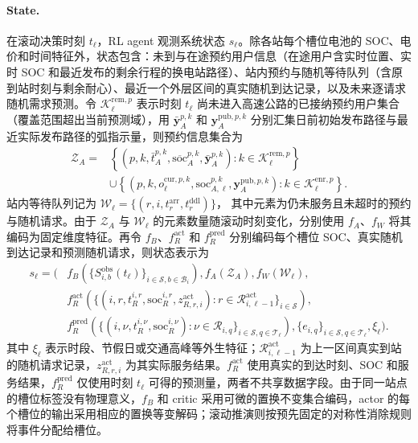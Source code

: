\documentclass[12pt,a4paper,UTF8]{ctexart}
\begin{document}
\paragraph{State.}
在滚动决策时刻 $t_\ell$，RL agent 观测系统状态 $s_\ell$。除各站每个槽位电池的 SOC、电价和时间特征外，状态包含：未到与在途预约用户信息（在途用户含实时位置、实时 SOC 和最近发布的剩余行程的换电站路径）、站内预约与随机等待队列（含原到站时刻与剩余耐心）、最近一个外层区间的真实随机到达记录，以及未来逐请求随机需求预测。令
$\mathcal K_\ell^{\mathrm{rem},p}$ 表示时刻 $t_\ell$ 尚未进入高速公路的已接纳预约用户集合（覆盖范围超出当前预测域），用 $\bar{\mathbf y}_A^{p,k}$ 和 $\mathbf y_A^{\mathrm{pub},p,k}$ 分别汇集日前初始发布路径与最近实际发布路径的弧指示量，则预约信息集合为
\begin{equation}
\begin{aligned}
\mathcal Z_{A}
={}&
\left\{
\left(p,k,\bar t_A^{p,k},
\overline{\mathrm{soc}}_A^{p,k},
\bar{\mathbf y}_A^{p,k}\right):
k\in\mathcal K_\ell^{\mathrm{rem},p}
\right\}\\
&\cup
\left\{
\left(p,k,o_\ell^{\mathrm{cur},p,k},\mathrm{soc}_{A,\ell}^{p,k},
\mathbf y_A^{\mathrm{pub},p,k}\right):
k\in\mathcal K_\ell^{\mathrm{enr},p}
\right\}.
\end{aligned}
\label{eq:rl_reservation_information}
\end{equation}
站内等待队列记为
$\mathcal W_\ell=\{(r,i,t_r^{\mathrm{arr}},t_r^{\mathrm{ddl}})\}$，
其中元素为仍未服务且未超时的预约与随机请求。由于 $\mathcal Z_{A}$ 与 $\mathcal W_\ell$ 的元素数量随滚动时刻变化，分别使用 $f_A$、$f_W$ 将其编码为固定维度特征。再令 $f_B$、$f_R^{\mathrm{act}}$ 和 $f_R^{\mathrm{pred}}$ 分别编码每个槽位 SOC、真实随机到达记录和预测随机请求，则状态表示为
\begin{equation}
\begin{aligned}
s_\ell=\Big(&
f_B\!\left(\{S_{i,b}^{\mathrm{obs}}(t_\ell)\}_{i\in\mathcal S,b\in\mathcal B_i}\right),
f_A(\mathcal Z_{A}),
f_W(\mathcal W_\ell),\\
&
f_R^{\mathrm{act}}\!\left(
\{(i,r,t_R^{i,r},\mathrm{soc}_R^{i,r},z_{R,r,i}^{\mathrm{act}}):
r\in\mathcal R_{i,\ell-1}^{\mathrm{act}}\}_{i\in\mathcal S}
\right),\\
&
f_R^{\mathrm{pred}}\!\left(
\{(i,\nu,t_{R}^{i,\nu},\mathrm{soc}_{R}^{i,\nu}):
\nu\in\mathcal R_{i,q}\}_{i\in\mathcal S,q\in\mathcal T_\ell}
\right),
\{e_{i,q}\}_{i\in\mathcal S,q\in\mathcal T_\ell},
\xi_\ell
\Big).
\end{aligned}
\label{eq:rl_state}
\end{equation}
其中 $\xi_\ell$ 表示时段、节假日或交通高峰等外生特征；$\mathcal R_{i,\ell-1}^{\mathrm{act}}$ 为上一区间真实到站的随机请求记录，$z_{R,r,i}^{\mathrm{act}}$ 为其实际服务结果。$f_R^{\mathrm{act}}$ 使用真实的到达时刻、SOC 和服务结果，$f_R^{\mathrm{pred}}$ 仅使用时刻 $t_\ell$ 可得的预测量，两者不共享数据字段。由于同一站点的槽位标签没有物理意义，$f_B$ 和 critic 采用可微的置换不变集合编码，actor 的每个槽位的输出采用相应的置换等变解码；滚动推演则按预先固定的对称性消除规则将事件分配给槽位。
\end{document}
